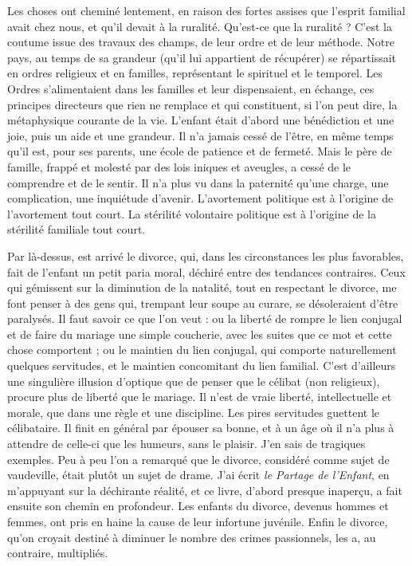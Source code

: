 \documentclass[french,twoside]{book} %
\begin{document}
Les choses ont cheminé lentement, en raison des fortes assises que l’esprit familial avait chez nous, et qu’il devait à la ruralité. Qu’est-ce que la ruralité ? C’est la coutume issue des travaux des champs, de leur ordre et de leur méthode. Notre pays, au temps de sa grandeur (qu’il lui appartient de récupérer) se répartissait en ordres religieux et en familles, représentant le spirituel et le temporel. Les Ordres s’alimentaient dans les familles et leur dispensaient, en échange, ces principes directeurs que rien ne remplace et qui constituent, si l’on peut dire, la métaphysique courante de la vie. L’enfant était d’abord une bénédiction et une joie, puis un aide et une grandeur. Il n’a jamais cessé de l’être, en même temps qu’il est, pour ses parents, une école de patience et de fermeté. Mais le père de famille, frappé et molesté par des lois iniques et aveugles, a cessé de le comprendre et de le sentir. Il n’a plus vu dans la paternité qu’une charge, une complication, une inquiétude d’avenir. L’avortement politique est à l’origine de l’avortement tout court. La stérilité volontaire politique est à l’origine de la stérilité familiale tout court.\par
Par là-dessus, est arrivé le divorce, qui, dans les circonstances les plus favorables, fait de l’enfant un petit paria moral, déchiré entre des tendances contraires. Ceux qui gémissent sur la diminution de la natalité, tout en respectant le divorce, me font penser à des gens qui, trempant leur soupe au curare, se désoleraient d’être paralysés. Il faut savoir ce que l’on veut : ou la liberté de rompre le lien conjugal et de faire du mariage une simple coucherie, avec les suites que ce mot et cette chose comportent ; ou le maintien du lien conjugal, qui comporte naturellement quelques servitudes, et le maintien concomitant du lien familial. C’est d’ailleurs une singulière illusion d’optique que de penser que le célibat (non religieux), procure plus de liberté que le mariage. Il n’est de vraie liberté, intellectuelle et morale, que dans une règle et une discipline. Les pires servitudes guettent le célibataire. Il finit en général par épouser sa bonne, et à un âge où il n’a plus à attendre de celle-ci que les humeurs, sans le plaisir. J’en sais de tragiques exemples. Peu à peu l’on a remarqué que le divorce, considéré comme sujet de vaudeville, était plutôt un sujet de drame. J’ai écrit {\itshape le Partage de l’Enfant}, en m’appuyant sur la déchirante réalité, et ce livre, d’abord presque inaperçu, a fait ensuite son chemin en profondeur. Les enfants du divorce, devenus hommes et femmes, ont pris en haine la cause de leur infortune juvénile. Enfin le divorce, qu’on croyait destiné à diminuer le nombre des crimes passionnels, les a, au contraire, multipliés.\par
\end{document}
